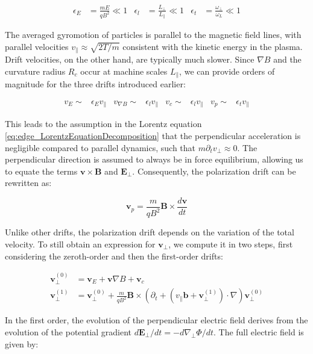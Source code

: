 \begin{align}
	\epsilon_E &= \frac{mE}{qB^2} \ll 1 & \epsilon_l &= \frac{L_\perp}{L_\parallel} \ll 1 & \epsilon_t &= \frac{\omega_\perp}{\omega_L} \ll 1
\end{align}

The averaged gyromotion of particles is parallel to the magnetic field lines, with parallel velocities $v_\parallel \approx \sqrt{2T/m}$ consistent with the kinetic energy in the plasma. Drift velocities, on the other hand, are typically much slower. Since $\nabla B$ and the curvature radius $R_c$ occur at machine scales $L_\parallel$, we can provide orders of magnitude for the three drifts introduced earlier:

\begin{align}
	v_E \sim& \epsilon_E v_\parallel & v_{\nabla B} \sim& \epsilon_l v_\parallel & v_c \sim& \epsilon_l v_\parallel & v_p \sim& \epsilon_t v_\parallel
\end{align}

This leads to the assumption in the Lorentz equation \ref{eq:edge_LorentzEquationDecomposition} that the perpendicular acceleration is negligible compared to parallel dynamics, such that $m\partial_t v_\perp \approx 0$. The perpendicular direction is assumed to always be in force equilibrium, allowing us to equate the terms $\mathbf{v} \times \mathbf{B}$ and $\mathbf{E}_\perp$. Consequently, the polarization drift can be rewritten as:

\begin{equation}
	\mathbf{v}_p = \frac{m}{qB^2}\mathbf{B} \times \frac{d\mathbf{v}}{dt}
\end{equation}

Unlike other drifts, the polarization drift depends on the variation of the total velocity. To still obtain an expression for $\mathbf{v}_\perp$, we compute it in two steps, first considering the zeroth-order and then the first-order drifts:

\begin{align}
	\mathbf{v}_\perp^{(0)} &= \mathbf{v}_E + \mathbf{v}{\nabla B} + \mathbf{v}_c \\
	\mathbf{v}_\perp^{(1)} &= \mathbf{v}_\perp^{(0)} + \frac{m}{qB^2}\mathbf{B} \times \left(\partial_t + \left(v_\parallel\mathbf{b} + \mathbf{v}_\perp^{(1)}\right) \cdot \nabla\right)\mathbf{v}_\perp^{(0)} \label{eq:edge_vPerpDrifts}
\end{align}

In the first order, the evolution of the perpendicular electric field derives from the evolution of the potential gradient $d\mathbf{E}_\perp / dt = -d\nabla_\perp \Phi / dt$. The full electric field is given by:

